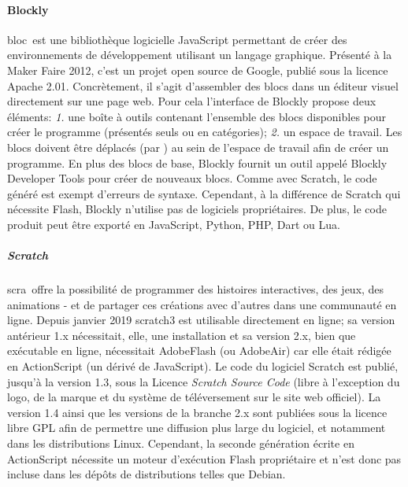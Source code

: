             \paragraph{Blockly}\label{sec:Blockly}
                \glsdesc{bloc}~est une bibliothèque logicielle JavaScript permettant de créer des environnements de développement utilisant un langage graphique. Présenté à la Maker Faire 2012, c'est un projet open source de Google, publié sous la licence Apache 2.01.
                Concrètement, il s'agit d'assembler des blocs dans un éditeur visuel directement sur une page web. Pour cela l'interface de Blockly propose deux éléments: \textit{1.} une boîte à outils contenant l'ensemble des blocs disponibles pour créer le programme (présentés seuls ou en catégories); \textit{2.} un espace de travail. Les blocs doivent être déplacés (par ) au sein de l'espace de travail afin de créer un programme. En plus des blocs de base, Blockly fournit un outil appelé Blockly Developer Tools pour créer de nouveaux blocs. 
                Comme avec Scratch, le code généré est exempt d'erreurs de syntaxe. Cependant, à la différence de Scratch qui nécessite Flash, Blockly n'utilise pas de logiciels propriétaires. De plus, le code produit peut être exporté en JavaScript, Python, PHP, Dart ou Lua.\par%
            \label{sec:Scrtach}
                \subparagraph{\texorpdfstring{\indent Scratch}{Scratch}}
                    \glsdesc{scra}~offre la possibilité de programmer des histoires interactives, des jeux, des animations - et de partager ces créations avec d'autres dans une communauté en ligne.
                    Depuis janvier 2019 scratch3 est utilisable directement en ligne; sa version antérieur 1.x nécessitait, elle, une installation et sa version 2.x, bien que exécutable en ligne, nécessitait AdobeFlash (ou AdobeAir) car elle était rédigée en ActionScript (un dérivé de JavaScript).
                    Le code du logiciel Scratch est publié, jusqu’à la version 1.3, sous la Licence \textit{Scratch Source Code} (libre à l’exception du logo, de la marque et du système de téléversement sur le site web officiel).
                    La version 1.4 ainsi que les versions de la branche 2.x sont publiées sous la licence libre GPL afin de permettre une diffusion plus large du logiciel, et notamment dans les distributions Linux. Cependant, la seconde génération écrite en ActionScript nécessite un moteur d’exécution Flash propriétaire et n’est donc pas incluse dans les dépôts de distributions telles que Debian.
